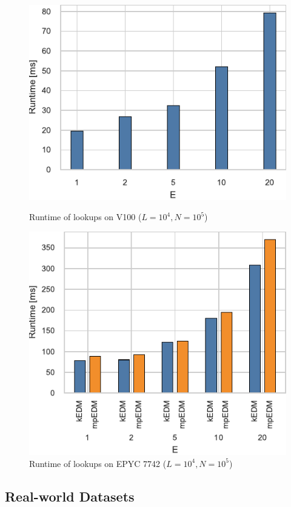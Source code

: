 \documentclass{acmart}
\begin{document}
\begin{figure}
    \centering
    \begin{minipage}{.5\textwidth}
    \includegraphics[width=.9\linewidth]{figs/runtime_lookup_v100}
    \caption{Runtime of lookups on V100 ($L=10^4, N=10^5$)}%
    \label{fig:breakdown-lookup-v100}
    \end{minipage}%
    \begin{minipage}{.5\textwidth}
    \includegraphics[width=.9\linewidth]{figs/runtime_lookup_epyc}
    \caption{Runtime of lookups on EPYC 7742 ($L=10^4, N=10^5$)}%
    \label{fig:breakdown-lookup-epyc}
    \end{minipage}
\end{figure}

\subsection{Real-world Datasets}
\end{document}
